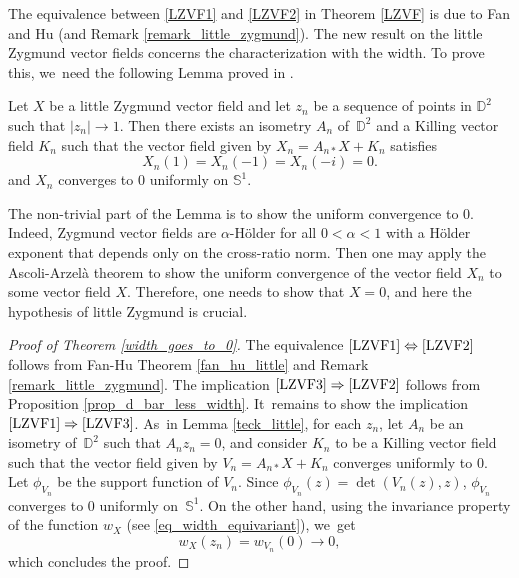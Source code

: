 The equivalence between \eqref{LZVF1} and \eqref{LZVF2} in Theorem \ref{LZVF} is due to Fan and Hu \cite{FanJun} (and Remark \ref{remark_little_zygmund}). The new result on the little Zygmund vector fields concerns the characterization with the width. To prove this, we~need the following Lemma proved in \cite{FanJun}.

\begin{lemma}
\label{teck_little}
Let $X$ be a little Zygmund vector field and let $z_n$ be a sequence of points in $\mathbb{D}^2$ such that $\lvert z_n\rvert\to1$. Then there exists an isometry $A_n$ of~$\mathbb{D}^2$ and a Killing vector field $K_n$ such that the vector field given by $X_n=A_{n*}X+K_n$ satisfies\vspace*{-3pt}
\[
X_n(1)=X_n(-1)=X_n(-i)=0.
\]
and $X_n$ converges to $0$ uniformly on $\mathbb{S}^1$.
\end{lemma}

The non-trivial part of the Lemma is to show the uniform convergence to $0$. Indeed, Zygmund vector fields are $\alpha$-Hölder for all $0<\alpha<1$ with a Hölder exponent that depends only on the cross-ratio norm. Then one may apply the Ascoli-Arzelà theorem to show the uniform convergence of the vector field $X_n$ to some vector field $X$. Therefore, one needs to show that $X=0$, and here the hypothesis of little Zygmund is crucial.

\begin{proof}[Proof of Theorem \ref{width_goes_to_0}]
The equivalence $\eqref{LZVF1}\Leftrightarrow\eqref{LZVF2}$ follows from Fan-Hu Theorem \ref{fan_hu_little} and Remark \ref{remark_little_zygmund}. The implication $\eqref{LZVF3}\Rightarrow\eqref{LZVF2}$ follows from Proposition \ref{prop_d_bar_less_width}. It~remains to show the implication $\eqref{LZVF1}\Rightarrow\eqref{LZVF3}$. As~in Lemma \ref{teck_little}, for each $z_n$, let $A_n$ be an isometry of~$\mathbb{D}^2$ such that $A_nz_n=0$, and consider $K_n$ to be a Killing vector field such that the vector field given by $V_n=A_{n*}X+K_n$ converges uniformly to $0$.
Let \(\phi_{V_n}\) be the support function of \(V_n\). Since \(\phi_{V_n}(z) = \det(V_n(z), z)\), \(\phi_{V_n}\) converges to \(0\) uniformly on~\(\mathbb{S}^1\). On the other hand, using the invariance property of the function \(w_X\) (see \eqref{eq_width_equivariant}), we~get
\[ w_X(z_n) = w_{V_n}(0) \to 0, \]
which concludes the proof.
\end{proof}

